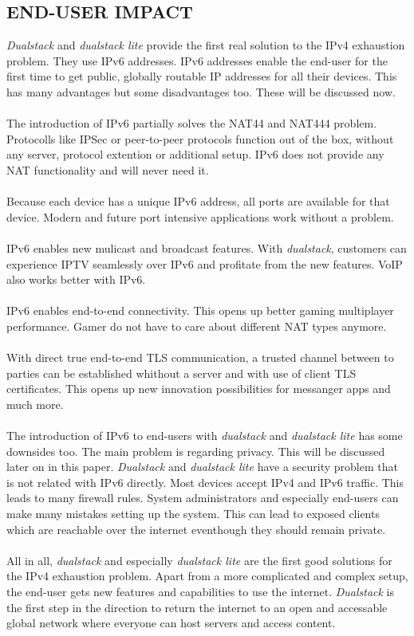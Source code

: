 \documentclass[format=sigconf, natbib=true, nonacm=true]{acmart}
\begin{document}
    \subsection*{END-USER IMPACT}
    \textit{Dualstack} and \textit{dualstack lite} provide the first real solution to the IPv4 exhaustion problem. They use IPv6 addresses. IPv6 addresses enable the end-user for the first time to get public, globally routable IP addresses for all their devices. This has many advantages but some disadvantages too. These will be discussed now.\\\\The introduction of IPv6 partially solves the NAT44 and NAT444 problem. Protocolls like IPSec or peer-to-peer protocols function out of the box, without any server, protocol extention or additional setup. IPv6 does not provide any NAT functionality and will never need it.\\\\Because each device has a unique IPv6 address, all ports are available for that device. Modern and future port intensive applications work without a problem.\\\\IPv6 enables new mulicast and broadcast features. With \textit{dualstack}, customers can experience IPTV seamlessly over IPv6 and profitate from the new features. VoIP also works better with IPv6. \\\\IPv6 enables end-to-end connectivity. This opens up better gaming multiplayer performance. Gamer do not have to care about different NAT types anymore.\\\\With direct true end-to-end TLS communication, a trusted channel between to parties can be established whithout a server and with use of client TLS certificates. This opens up new innovation possibilities for messanger apps and much more.\\\\The introduction of IPv6 to end-users with \textit{dualstack} and \textit{dualstack lite} has some downsides too. The main problem is regarding privacy. This will be discussed later on in this paper. \textit{Dualstack} and \textit{dualstack lite} have a security problem that is not related with IPv6 directly. Most devices accept IPv4 and IPv6 traffic. This leads to many firewall rules. System administrators and especially end-users can make many mistakes setting up the system. This can lead to exposed clients which are reachable over the internet eventhough they should remain private.\\\\All in all, \textit{dualstack} and especially \textit{dualstack lite} are the first good solutions for the IPv4 exhaustion problem. Apart from a more complicated and complex setup, the end-user gets new features and capabilities to use the internet. \textit{Dualstack} is the first step in the direction to return the internet to an open and accessable global network where everyone can host servers and access content.
\end{document}
